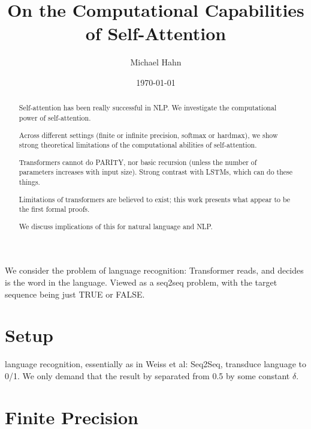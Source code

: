 \documentclass[11pt,a4paper]{article}
\title{On the Computational Capabilities of Self-Attention}
\author{Michael Hahn}
\date{\today}
\begin{document}
\maketitle
\begin{abstract}
    Self-attention has been really successful in NLP.
    We investigate the computational power of self-attention.
    
    Across different settings (finite or infinite precision, softmax or hardmax), we show strong theoretical limitations of the computational abilities of self-attention.
    
    Transformers cannot do PARITY, nor basic recursion (unless the number of parameters increases with input size).
    Strong contrast with LSTMs, which can do these things.
    
    
    
    
    Limitations of transformers are believed to exist; this work presents what appear to be the first formal proofs.
    
    We discuss implications of this for natural language and NLP.
\end{abstract}


We consider the problem of language recognition: Transformer reads, and decides is the word in the language. Viewed as a seq2seq problem, with the target sequence being just TRUE or FALSE.



\section{Setup}

language recognition, essentially as in Weiss et al: Seq2Seq, transduce language to 0/1. We only demand that the result by separated from 0.5 by some constant $\delta$.


\section{Finite Precision}
\end{document}
